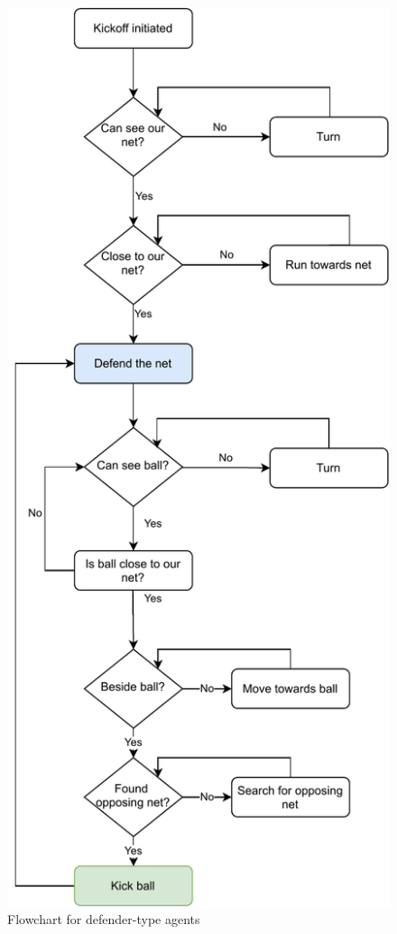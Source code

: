 \documentclass[conference]{IEEEtran}
\begin{document}
\begin{figure}[]
	\centering
	\includegraphics[scale=0.5]{fig/defender-flowchart.pdf}
	\caption{Flowchart for defender-type agents}
	\label{flowchart-defender}
\end{figure}
\end{document}
